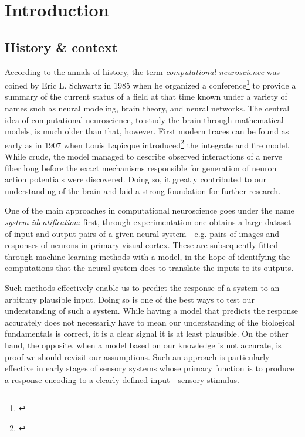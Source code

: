 \chapter*{Introduction}

\section*{History \& context}
According to the annals of history, the term \textit{computational neuroscience} was coined by Eric L. Schwartz in 1985 when he organized a conference\footnote{\citep{schwartz1990computational}} to provide a summary of the current status of a field at that time known under a variety of names such as neural modeling, brain theory, and neural networks. The central idea of computational neuroscience, to study the brain through mathematical models, is much older than that, however. First modern traces can be found as early as in 1907 when Louis Lapicque introduced\footnote{\citep{Lapicque1907}} the integrate and fire model. While crude, the model managed to describe observed interactions of a nerve fiber long before the exact mechanisms responsible for generation of neuron action potentials were discovered. Doing so, it greatly contributed to our understanding of the brain and laid a strong foundation for further research.

One of the main approaches in computational neuroscience goes under the name \textit{system identification}: first, through experimentation one obtains a large dataset of input and output pairs of a given neural system - e.g. pairs of images and responses of neurons in primary visual cortex. These are subsequently fitted through machine learning methods with a model, in the hope of identifying the computations that the neural system does to translate the inputs to its outputs. 

Such methods effectively enable us to predict the response of a system to an arbitrary plausible input. Doing so is one of the best ways to test our understanding of such a system. While having a model that predicts the response accurately does not necessarily have to mean our understanding of the biological fundamentals is correct, it is a clear signal it is at least plausible. On the other hand, the opposite, when a model based on our knowledge is not accurate, is proof we should revisit our assumptions. Such an approach is particularly effective in early stages of sensory systems whose primary function is to produce a response encoding to a clearly defined input - sensory stimulus. 

